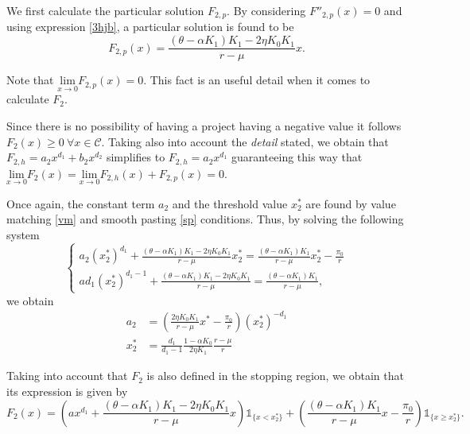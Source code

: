 We first calculate the particular solution $F_{2,p}$. By considering $F''_{2,p}(x)=0$ and using expression \eqref{3hjb}, a particular solution is found to be 
\begin{equation}
F_{2,p}(x)=\frac{(\theta-\alpha K_1)K_1-2 \eta K_0 K_1}{r-\mu}x.
	\label{F2p}
\end{equation}

Note that $\underset{x \to 0}{\text{lim}} F_{2,p}(x)=0$. This fact is an useful detail when it comes to calculate $F_2$.

Since there is no possibility of having a project having a negative value it follows $F_2(x) \geq 0 \ \forall x \in \mathcal{C}$. Taking also into account the \textit{detail} stated, we obtain that $F_{2,h}=a_2 x^{d_1}+b_2 x^{d_2}$ simplifies to $F_{2,h}=a_2 x^{d_1}$ guaranteeing this way that $\underset{x \to 0}{\text{lim}} F_2(x)=\underset{x \to 0}{\text{lim}} F_{2,h}(x)+F_{2,p}(x)=0$.

Once again, the constant term $a_2$ and the threshold value $x_2^*$ are found by value matching \eqref{vm} and smooth pasting \eqref{sp} conditions. Thus, by solving the following system
\begin{equation}
\begin{cases} 
a_2(x_2^*)^{d_1}+\frac{(\theta-\alpha K_1)K_1-2 \eta K_0 K_1}{r-\mu}x_2^*=\frac{(\theta-\alpha K_1)K_1}{r-\mu} x_2^* -\frac{\pi_0}{r} \\
ad_1(x_2^*)^{d_1-1}+\frac{(\theta-\alpha K_1)K_1-2 \eta K_0 K_1}{r-\mu}=\frac{(\theta-\alpha K_1)K_1}{r-\mu},
\end{cases}
\end{equation}
we obtain
\begin{align}
a_2 &= \left( \frac{2\eta K_0 K_1}{r-\mu}x^*-\frac{\pi_0}{r} \right)(x_2^*)^{-d_1} \nonumber \\
x_2^*&=\frac{d_1}{d_1-1} \frac{1-\alpha K_0}{2 \eta K_1} \frac{r-\mu}{r} \label{3:x2}
\end{align}


Taking into account that $F_2$ is also defined in the stopping region, we obtain that its expression is given by
\begin{equation}
F_2(x)=\left( ax^{d_1} +\frac{(\theta-\alpha K_1)K_1-2 \eta K_0 K_1}{r-\mu}x \right) \mathds{1}_{ \{ x<x_2^* \} }+ \left( \frac{(\theta-\alpha K_1)K_1}{r-\mu} x -\frac{\pi_0}{r} \right)\mathds{1}_{ \{ x\geq x_2^* \} }.
\label{eq:f2}
\end{equation}


